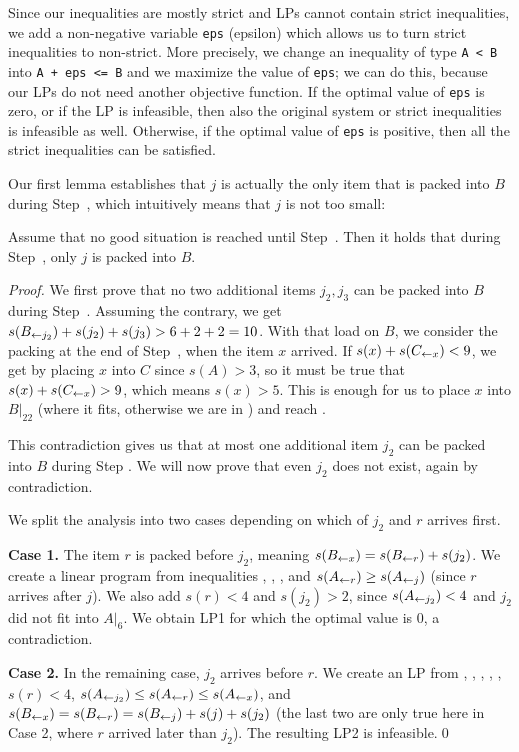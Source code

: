 Since our inequalities are mostly strict and LPs cannot
contain strict inequalities, we add a non-negative variable \texttt{eps} (epsilon)
which allows us to turn strict inequalities to non-strict.
More precisely, we change an inequality of type \texttt{A < B} into \texttt{A + eps <= B}
and we maximize the value of \texttt{eps}; we can do this, because our LPs
do not need another objective function. If the optimal value of \texttt{eps} 
is zero, or if the LP is infeasible, then also the original system or strict inequalities
is infeasible as well. Otherwise, if the optimal value of \texttt{eps} is positive,
then all the strict inequalities can be satisfied.

Our first lemma establishes that $j$ is actually the only item that
is packed into $B$ during Step~, which intuitively means that
$j$ is not too small:

\begin{lem}\label{lem:onej}
Assume that no good situation is reached until Step~{\rm {}}. Then
it holds that during Step~{\rm {}}, only $j$ is packed into $B$.
\end{lem}

\begin{proof}
We first prove that no two additional items $j_2, j_3$ can be packed into $B$
during Step~. Assuming the contrary, we get $s(B_{\leftarrow j_2}) +
s(j_2) + s(j_3) > 6 + 2 + 2 = 10$. With that load on $B$, we consider
the packing at the end of Step~, when the item $x$ arrived. If
$s(x) + s(C_{\leftarrow x}) < 9$, we get  by placing $x$ into $C$ since $s(A)>3$, so it must be true
that $s(x) + s(C_{\leftarrow x}) > 9$, which means $s(x) >
5$. This is enough for us to place $x$ into $B|_{22}$
(where it fits, otherwise we are in ) and reach .

This contradiction gives us that at most one additional item $j_2$ can
be packed into $B$ during Step . We will now prove that
even $j_2$ does not exist, again by contradiction.

We split the analysis into two cases depending on which of $j_2$ and $r$ arrives first.

\smallskip
\noindent \textbf{Case 1.} The item $r$ is packed
before $j_2$, meaning $s(B_{\leftarrow x}) = s(B_{\leftarrow r}) + s(j_2)$.
We create a linear program from inequalities , , ,  
and $s(A_{\leftarrow r}) \ge s(A_{\leftarrow j})$ (since $r$ arrives after $j$).
We also add $s(r)<4$ and $s(j_2) > 2$, since
$s(A_{\leftarrow j_2}) < 4$ and $j_2$ did not fit into $A|_{6}$.
We obtain LP1 for which the optimal value is 0, a contradiction.

\smallskip

\noindent \textbf{Case 2.} In the remaining case, $j_2$ arrives before $r$.
We create an LP from , , , , , $s(r) < 4$,
$s(A_{\leftarrow j_2}) \le s(A_{\leftarrow r}) \le s(A_{\leftarrow x})$,
and $s(B_{\leftarrow x}) = s(B_{\leftarrow r}) = s(B_{\leftarrow j}) + s(j) + s(j_2)$
(the last two are only true here in Case 2, where $r$ arrived later than $j_2$).
The resulting LP2 is infeasible.\qed
\end{proof}

